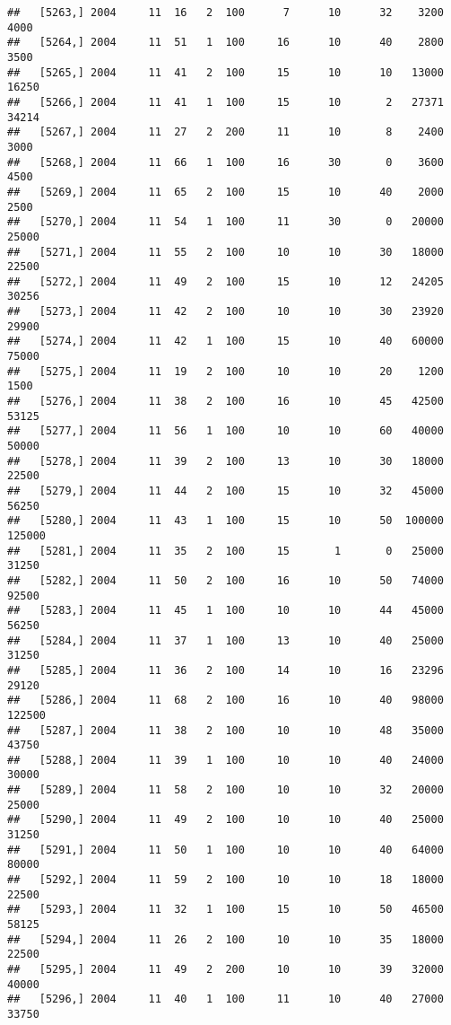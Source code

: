 \documentclass{article}\usepackage[]{graphicx}\usepackage[]{color}
\makeatletter
\newenvironment{kframe}{%
 \def\at@end@of@kframe{}%
 \ifinner\ifhmode%
  \def\at@end@of@kframe{\end{minipage}}%
  \begin{minipage}{\columnwidth}%
 \fi\fi%
 \def\FrameCommand##1{\hskip\@totalleftmargin \hskip-\fboxsep
 \colorbox{shadecolor}{##1}\hskip-\fboxsep
     \hskip-\linewidth \hskip-\@totalleftmargin \hskip\columnwidth}%
 \MakeFramed {\advance\hsize-\width
   \@totalleftmargin\z@ \linewidth\hsize
   \@setminipage}}%
 {\par\unskip\endMakeFramed%
 \at@end@of@kframe}
\newenvironment{knitrout}{}{} %
\makeatother
\begin{document}
\begin{knitrout}
\begin{kframe}
\begin{verbatim}
##   [5263,] 2004     11  16   2  100      7      10      32    3200    4000
##   [5264,] 2004     11  51   1  100     16      10      40    2800    3500
##   [5265,] 2004     11  41   2  100     15      10      10   13000   16250
##   [5266,] 2004     11  41   1  100     15      10       2   27371   34214
##   [5267,] 2004     11  27   2  200     11      10       8    2400    3000
##   [5268,] 2004     11  66   1  100     16      30       0    3600    4500
##   [5269,] 2004     11  65   2  100     15      10      40    2000    2500
##   [5270,] 2004     11  54   1  100     11      30       0   20000   25000
##   [5271,] 2004     11  55   2  100     10      10      30   18000   22500
##   [5272,] 2004     11  49   2  100     15      10      12   24205   30256
##   [5273,] 2004     11  42   2  100     10      10      30   23920   29900
##   [5274,] 2004     11  42   1  100     15      10      40   60000   75000
##   [5275,] 2004     11  19   2  100     10      10      20    1200    1500
##   [5276,] 2004     11  38   2  100     16      10      45   42500   53125
##   [5277,] 2004     11  56   1  100     10      10      60   40000   50000
##   [5278,] 2004     11  39   2  100     13      10      30   18000   22500
##   [5279,] 2004     11  44   2  100     15      10      32   45000   56250
##   [5280,] 2004     11  43   1  100     15      10      50  100000  125000
##   [5281,] 2004     11  35   2  100     15       1       0   25000   31250
##   [5282,] 2004     11  50   2  100     16      10      50   74000   92500
##   [5283,] 2004     11  45   1  100     10      10      44   45000   56250
##   [5284,] 2004     11  37   1  100     13      10      40   25000   31250
##   [5285,] 2004     11  36   2  100     14      10      16   23296   29120
##   [5286,] 2004     11  68   2  100     16      10      40   98000  122500
##   [5287,] 2004     11  38   2  100     10      10      48   35000   43750
##   [5288,] 2004     11  39   1  100     10      10      40   24000   30000
##   [5289,] 2004     11  58   2  100     10      10      32   20000   25000
##   [5290,] 2004     11  49   2  100     10      10      40   25000   31250
##   [5291,] 2004     11  50   1  100     10      10      40   64000   80000
##   [5292,] 2004     11  59   2  100     10      10      18   18000   22500
##   [5293,] 2004     11  32   1  100     15      10      50   46500   58125
##   [5294,] 2004     11  26   2  100     10      10      35   18000   22500
##   [5295,] 2004     11  49   2  200     10      10      39   32000   40000
##   [5296,] 2004     11  40   1  100     11      10      40   27000   33750

\end{verbatim}
\end{kframe}
\end{knitrout}
\end{document}
